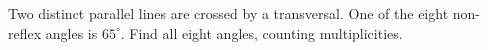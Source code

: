 Two distinct parallel lines are crossed by a transversal. One of the eight non-reflex angles is $65^\circ$. Find all eight angles, counting multiplicities.
